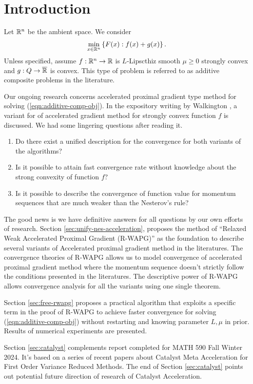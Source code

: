 \documentclass[12pt]{article}
\begin{document}
\section{Introduction}
    Let $\mathbb R^n$ be the ambient space. We consider 
    \begin{align}
        \min_{x \in \mathbb R^n} \left\lbrace
            F(x): f(x) + g(x)
        \right\rbrace.
    \end{align}\label{eqn:additive-comp-obj}
    Unless specified, assume $f:\mathbb R^n \rightarrow \mathbb R$ is $L$-Lipscthiz smooth $\mu \ge 0$ strongly convex and $g:Q \rightarrow \overline {\mathbb R}$ is convex. 
    This type of problem is referred to as additive composite problems in the literature. 
    \par
    Our ongoing research concerns accelerated proximal gradient type method for solving (\ref{eqn:additive-comp-obj}). 
    In the expository writing by Walkington \cite{noel_nesterovs_nodate}, a variant for of accelerated gradient method for strongly convex function $f$ is discussed. 
    We had some lingering questions after reading it. 
    \begin{enumerate}
        \item Do there exist a unified description for the convergence for both variants of the algorithms?
        \item Is it possible to attain fast convergence rate without knowledge about the strong convexity of function $f$?
        \item Is it possible to describe the convergence of function value for momentum sequences that are much weaker than the Nesterov's rule? 
    \end{enumerate}
    The good news is we have definitive answers for all questions by our own efforts of research. 
    Section \ref{sec:unify-nes-acceleration}, proposes the method of ``Relaxed Weak Accelerated Proximal Gradient (R-WAPG)'' as the foundation to describe several variants of Accelerated proximal gradient method in the literatures. 
    The convergence theories of R-WAPG allows us to model convergence of accelerated proximal gradient method where the momentum sequence doesn't strictly follow the conditions presented in the literatures. 
    The descriptive power of R-WAPG allows convergence analysis for all the variants using one single theorem. 
    \par
    Section \ref{sec:free-rwapg} proposes a practical algorithm that exploits a specific term in the proof of R-WAPG to achieve faster convergence for solving (\ref{eqn:additive-comp-obj}) without restarting and knowing parameter $L, \mu$ in prior. 
    Results of numerical experiments are presented. 
    \par
    Section \ref{sec:catalyst} complements report completed for MATH 590 Fall Winter 2024. 
    It's based on a series of recent papers \cite{lin_universal_2015,lin_catalyst_2018,paquette_catalyst_2018} about Catalyst Meta Acceleration for First Order Variance Reduced Methods. 
    The end of Section \ref{sec:catalyst} points out potential future direction of research of Catalyst Acceleration. 
\end{document}
